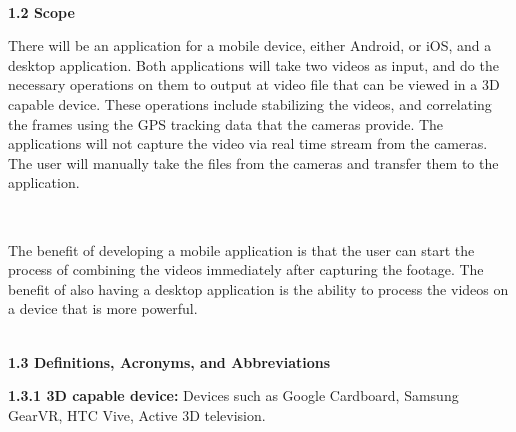 \documentclass[10pt,draftclsnofoot,onecolumn]{IEEEtran}
\begin{document}
\\
\vspace{5mm}
{\Medium\textbf{1.2 Scope}}\\
\vspace{5mm}

There will be an application for a mobile device, either Android, or iOS, and a desktop application. Both applications will take two videos as input, and do the necessary operations on them to output at video file that can be viewed in a 3D capable device. These operations include stabilizing the videos, and correlating the frames using the GPS tracking data that the cameras provide. The applications will not capture the video via real time stream from the cameras. The user will manually take the files from the cameras and transfer them to the application.

 \\
\vspace{5mm}

The benefit of developing a mobile application is that the user can start the process of combining the videos immediately after capturing the footage. The benefit of also having a desktop application is the ability to process the videos on a device that is more powerful. \\

 \\
\vspace{5mm}

{\Medium\textbf{1.3 Definitions, Acronyms, and Abbreviations}}\\
\vspace{5mm}

\textbf{1.3.1 3D capable device:}   Devices such as Google Cardboard, Samsung GearVR, HTC Vive,  Active 3D television.
 \vspace{5mm}
\end{document}
